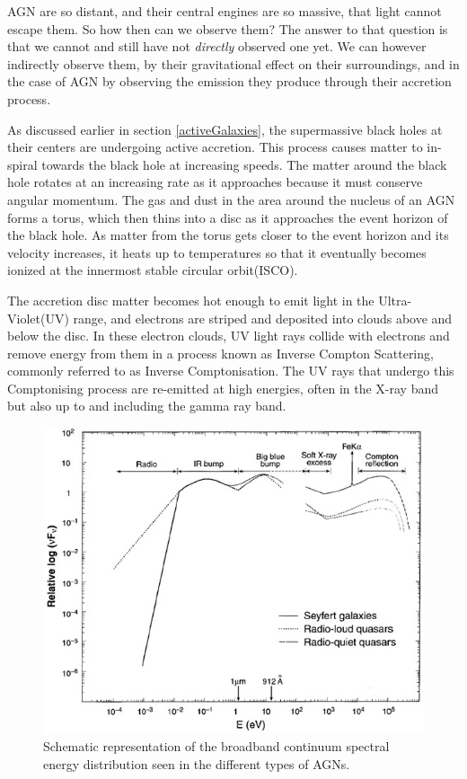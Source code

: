 \documentclass[12pt, oneside]{smuthesis}
\begin{document}
AGN are so distant, and their central engines are so massive, that light cannot escape them. So how then can we observe them? The answer to that question is that we cannot and still have not \textit{directly} observed one yet. We can however indirectly observe them, by their gravitational effect on their surroundings, and in the case of AGN by observing the emission they produce through their accretion process.

As discussed earlier in section \ref{activeGalaxies}, the supermassive black holes at their centers are undergoing active accretion. This process causes matter to in-spiral towards the black hole at increasing speeds. The matter around the black hole rotates at an increasing rate as it approaches because it must conserve angular momentum. The gas and dust in the area around the nucleus of an AGN forms a torus, which then thins into a disc as it approaches the event horizon of the black hole. As matter from the torus gets closer to the event horizon and its velocity increases, it heats up to temperatures so that it eventually becomes ionized at the innermost stable circular orbit(ISCO).

The accretion disc matter becomes hot enough to emit light in the Ultra-Violet(UV) range, and electrons are striped and deposited into clouds above and below the disc. In these electron clouds, UV light rays collide with electrons and remove energy from them in a process known as Inverse Compton Scattering, commonly referred to as Inverse Comptonisation. The UV rays that undergo this Comptonising process are re-emitted at high energies, often in the X-ray band but also up to and including the gamma ray band.

\begin{figure}[H]
	\centering
	\begin{minipage}{0.8\linewidth}
		\centering
		\includegraphics[width=0.8\linewidth]{AGN-spectra}
		\caption{Schematic representation of the broadband continuum spectral energy distribution seen in the different types of AGNs.}
		\label{fig:agn-continuum}
	\end{minipage}
\end{figure}
\end{document}
